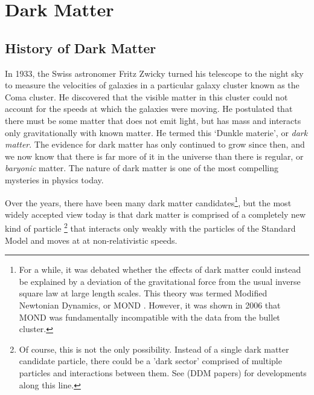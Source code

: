 \section{Dark Matter}
\subsection{History of Dark Matter}\label{history-of-dark-matter}

In 1933, the Swiss astronomer Fritz Zwicky turned his telescope to the night sky to measure the velocities of galaxies in a particular galaxy cluster known as the Coma cluster. He discovered that the visible matter in this cluster could not account for the speeds at which the galaxies were moving. He postulated that there must be some matter that does not emit light, but has mass and interacts only gravitationally with known matter. He termed this `Dunkle materie', or \emph{dark matter}. The evidence for dark matter has only continued to grow since then, and we now know that there is far more of it in the universe than there is regular, or \emph{baryonic} matter. The nature of dark matter is one of the most compelling mysteries in physics today.

Over the years, there have been many dark matter candidates\footnote{For a while, it was debated whether the effects of dark matter could instead be explained by a deviation of the gravitational force from the usual inverse square law at large length scales. This theory was termed Modified Newtonian Dynamics, or MOND \citep{Milgrom1983}. However, it was shown in 2006 \citep{Clowe2006} that MOND was fundamentally incompatible with the data from the bullet cluster.}, but the most widely accepted view today is that dark matter is comprised of a completely new kind of particle \footnote{Of course, this is not the only possibility. Instead of a single dark matter candidate particle, there could be a 'dark sector' comprised of multiple particles and interactions between them. See (DDM papers) for developments along this line.} that interacts only weakly with the particles of the Standard Model and moves at at non-relativistic speeds.

